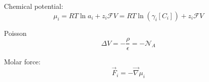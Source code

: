 \documentclass[aps,12pt]{revtex4}
\begin{document}
Chemical potential:
\begin{equation}
	\mu_i = RT \ln a_i + z_i \mathcal{F} V = RT \ln (\gamma_i[C_i]) + z_i \mathcal{F} V
\end{equation}

Poisson
\begin{equation}
	\Delta V = - \dfrac{\rho}{\epsilon} = -\mathcal{N}_A 
\end{equation}

Molar force:
\begin{equation}
	\vec{F}_i = - \vec{\nabla} \mu_i
\end{equation}
\end{document}
